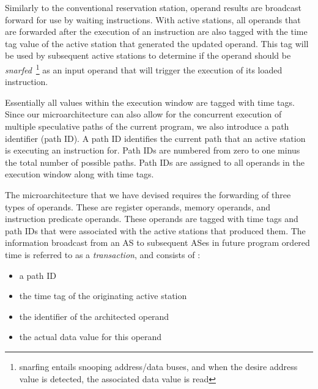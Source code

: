 \documentclass[10pt,twocolumn,dvips]{article}
\begin{document}
Similarly to the conventional reservation station, operand results
are broadcast forward for use by waiting instructions.
With active stations, all operands that are forwarded after the execution
of an instruction are also tagged with the time tag value of the
active station that generated the updated operand.
This tag will be used by subsequent active stations to determine if
the operand should be {\em snarfed}~\footnote{snarfing entails snooping
address/data buses, and when the desire address value is detected, 
the associated data value is read} 
as an input operand that will trigger
the execution of its loaded instruction.

Essentially all values within the execution
window are tagged with time tags.
Since our microarchitecture can also allow for the concurrent
execution of multiple speculative paths of the current program,
we also introduce a path identifier (path ID).
A path ID 
identifies the current path that an active station is executing an instruction
for.  
Path IDs are numbered from zero
to one minus the total number of possible paths.
Path IDs are assigned to all operands in the execution window
along with time tags.

The microarchitecture that we have devised requires the
forwarding of three types of operands.  These are register
operands, memory operands, and instruction predicate operands.
These operands are tagged with time tags and path IDs that were associated
with the active stations that produced them.
The information 
broadcast from an AS to subsequent
ASes in future program ordered time is referred
to as a {\em transaction}, and consists of :
\vspace{-0.05in}
\begin{itemize}
\vspace{-0.1in}
\item{a path ID}
\vspace{-0.1in}
\item{the time tag of the originating active station}
\vspace{-0.1in}
\item{the identifier of the architected operand}
\vspace{-0.1in}
\item{the actual data value for this operand}
\vspace{-0.1in}
\end{itemize}   
\end{document}
